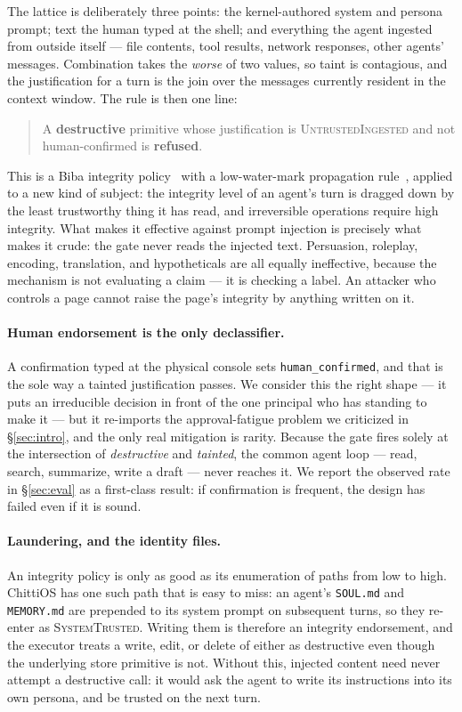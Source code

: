 \documentclass[11pt]{article}
\newcommand{\os}{ChittiOS}
\newcommand{\code}[1]{\texttt{#1}}
\begin{document}
The lattice is deliberately three points: the kernel-authored system and
persona prompt; text the human typed at the shell; and everything the agent
ingested from outside itself --- file contents, tool results, network
responses, other agents' messages. Combination takes the \emph{worse} of two
values, so taint is contagious, and the justification for a turn is the join
over the messages currently resident in the context window. The rule is then
one line:

\begin{quote}
A \textbf{destructive} primitive whose justification is
\textsc{UntrustedIngested} and not human-confirmed is \textbf{refused}.
\end{quote}

This is a Biba integrity policy~\cite{biba1977integrity} with a low-water-mark
propagation rule~\cite{fraser2000lomac}, applied to a new kind of subject: the
integrity level of an agent's turn is dragged down by the least trustworthy
thing it has read, and irreversible operations require high integrity. What
makes it effective against prompt injection is precisely what makes it crude:
the gate never reads the injected text. Persuasion, roleplay, encoding,
translation, and hypotheticals are all equally ineffective, because the
mechanism is not evaluating a claim --- it is checking a label. An attacker who
controls a page cannot raise the page's integrity by anything written on it.

\paragraph{Human endorsement is the only declassifier.} A confirmation typed
at the physical console sets \code{human\_confirmed}, and that is the sole way
a tainted justification passes. We consider this the right shape --- it puts an
irreducible decision in front of the one principal who has standing to make it
--- but it re-imports the approval-fatigue problem we criticized in
\S\ref{sec:intro}, and the only real mitigation is rarity. Because the gate
fires solely at the intersection of \emph{destructive} and \emph{tainted}, the
common agent loop --- read, search, summarize, write a draft --- never reaches
it. We report the observed rate in \S\ref{sec:eval} as a first-class result:
if confirmation is frequent, the design has failed even if it is sound.

\paragraph{Laundering, and the identity files.} An integrity policy is only as
good as its enumeration of paths from low to high. \os{} has one such path
that is easy to miss: an agent's \code{SOUL.md} and \code{MEMORY.md} are
prepended to its system prompt on subsequent turns, so they re-enter as
\textsc{SystemTrusted}. Writing them is therefore an integrity endorsement, and
the executor treats a write, edit, or delete of either as destructive even
though the underlying store primitive is not. Without this, injected content
need never attempt a destructive call: it would ask the agent to write its
instructions into its own persona, and be trusted on the next turn.
\end{document}
